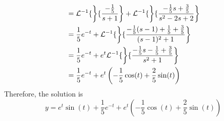 \documentclass[diffeq.tex]{subfiles}
\begin{document}
\begin{example}
\begin{alignat}{1}
            &= \mathcal{L}^{-1}\{\left\}\{\frac{-\frac{1}{5}}{s + 1}\right\} + \mathcal{L}^{-1}\{\left\}\{\frac{-\frac{1}{5}s + \frac{3}{5}}{s^{2} - 2s + 2}\right\}\\
            &= \frac{1}{5}e^{-t} + \mathcal{L}^{-1}\{\left\}\{\frac{-\frac{1}{5}(s - 1) + \frac{1}{5} + \frac{3}{5}}{(s - 1)^{2} + 1}\right\}\\
            &= \frac{1}{5}e^{-t} + e^{t}\mathcal{L}^{-1}\{\left\}\{\frac{-\frac{1}{5}s - \frac{1}{5}+ \frac{3}{5}}{s^{2} + 1}\right\}\\
            &= \frac{1}{5}e^{-t} + e^{t}\left(-\frac{1}{5}\cos(t) + \frac{2}{5}\sin(t)\right)
        \end{alignat}
        Therefore, the solution is
        \begin{equation}
            y = e^{t}\sin(t) + \frac{1}{5}e^{-t} + e^{t}\left(-\frac{1}{5}\cos(t) + \frac{2}{5}\sin(t)\right)
        \end{equation}
    \end{example}
\end{document}
